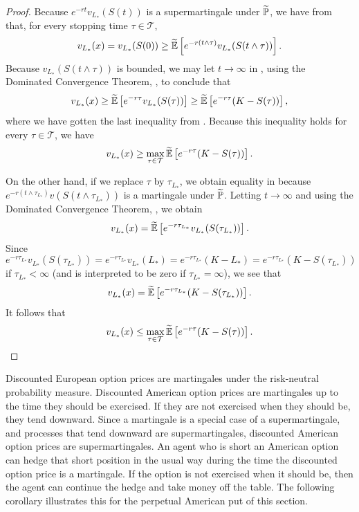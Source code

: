 \begin{proof}
	Because $e^{-rt}v_{L_*}(S(t))$ is a supermartingale under $\widetilde{\mathbb{P}}$, we have from  that, for every stopping time $\tau \in \mathcal{T}$,
	\begin{equation} \label{SupermartingaleOptionalSampling}
		v_{L_*}(x) = v_{L_*}(S(0)) \ge \widetilde{\mathbb{E}} \left[e^{-r(t\land\tau)}v_{L_*}(S(t \land \tau))\right].
	\end{equation}
	Because $v_{L_*}(S(t \land \tau))$ is bounded, we may let $t \to \infty$ in , using the Dominated Convergence Theorem, , to conclude that
	\[
		v_{L_*}(x) \ge \widetilde{\mathbb{E}} \left[e^{-r\tau}v_{L_*}(S(\tau))\right] \ge \widetilde{\mathbb{E}} \left[e^{-r\tau}(K - S(\tau))\right],
	\]
	where we have gotten the last inequality from . Because this inequality holds for every $\tau \in \mathcal{T}$, we have
	\[
		v_{L_*}(x) \ge \max_{\tau \in \mathcal{T}} \widetilde{\mathbb{E}} \left[e^{-r\tau}(K - S(\tau))\right].
	\]

	On the other hand, if we replace $\tau$ by $\tau_{L_*}$, we obtain equality in  because $e^{-r(t\land\tau_{L_*})}v(S(t \land \tau_{L_*}))$ is a martingale under $\widetilde{\mathbb{P}}$. Letting $t \to \infty$ and using the Dominated Convergence Theorem, , we obtain
	\[
		v_{L_*}(x) = \widetilde{\mathbb{E}} \left[e^{-r\tau_{L_*}}v_{L_*}(S(\tau_{L_*}))\right].
	\]
	Since
	\[
		e^{-r\tau_{L_*}}v_{L_*}(S(\tau_{L_*})) = e^{-r\tau_{L_*}}v_{L_*}(L_*) = e^{-r\tau_{L_*}}(K - L_*) = e^{-r\tau_{L_*}}(K - S(\tau_{L_*}))
	\]
	if $\tau_{L_*} < \infty$ (and is interpreted to be zero if $\tau_{L_*} = \infty$), we see that
	\begin{equation} \label{eq:ValueAtOptimalStopping}
		v_{L_*}(x) = \widetilde{\mathbb{E}} \left[e^{-r\tau_{L_*}}(K - S(\tau_{L_*}))\right].
	\end{equation}
	It follows that
	\[
		v_{L_*}(x) \le \max_{\tau \in \mathcal{T}} \widetilde{\mathbb{E}} \left[e^{-r\tau}(K - S(\tau))\right].
	\]
\end{proof}

Discounted European option prices are martingales under the risk-neutral probability measure. Discounted American option prices are martingales up to the time they should be exercised. If they are not exercised when they should be, they tend downward. Since a martingale is a special case of a supermartingale, and processes that tend downward are supermartingales, discounted American option prices are supermartingales. An agent who is short an American option can hedge that short position in the usual way during the time the discounted option price is a martingale. If the option is not exercised when it should be, then the agent can continue the hedge and take money off the table. The following corollary illustrates this for the perpetual American put of this section.


